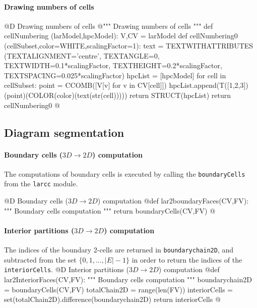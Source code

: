 \documentclass[11pt,oneside]{article}	%
\begin{document}
\paragraph{Drawing numbers of cells}

@D Drawing numbers of cells
@{""" Drawing numbers of cells """
def cellNumbering (larModel,hpcModel):
	V,CV = larModel
	def cellNumbering0 (cellSubset,color=WHITE,scalingFactor=1):
		text = TEXTWITHATTRIBUTES (TEXTALIGNMENT='centre', TEXTANGLE=0, 
							TEXTWIDTH=0.1*scalingFactor, 
							TEXTHEIGHT=0.2*scalingFactor, 
							TEXTSPACING=0.025*scalingFactor)
		hpcList = [hpcModel]
		for cell in cellSubset:
			point = CCOMB([V[v] for v in CV[cell]])
			hpcList.append(T([1,2,3])(point)(COLOR(color)(text(str(cell)))))
		return STRUCT(hpcList)
	return cellNumbering0
@}


\subsection{Diagram segmentation}

\paragraph{Boundary cells ($3D\to 2D$) computation}
The computations of boundary cells is executed by calling the \texttt{boundaryCells} from the \texttt{larcc} module.

@D Boundary cells ($3D\to 2D$) computation
@{def lar2boundaryFaces(CV,FV):
	""" Boundary cells computation """
	return boundaryCells(CV,FV)
@}

\paragraph{Interior partitions ($3D\to 2D$) computation}
The indices of the boundary 2-cells are returned in \texttt{boundarychain2D}, and subtracted from the set $\{0,1,\ldots,|E|-1\}$ in order to return the indices of the \texttt{interiorCells}.
@D Interior partitions ($3D\to 2D$) computation
@{def lar2InteriorFaces(CV,FV):
	""" Boundary cells computation """
	boundarychain2D = boundaryCells(CV,FV)
	totalChain2D = range(len(FV))
	interiorCells = set(totalChain2D).difference(boundarychain2D)
	return interiorCells
@}
\end{document}
